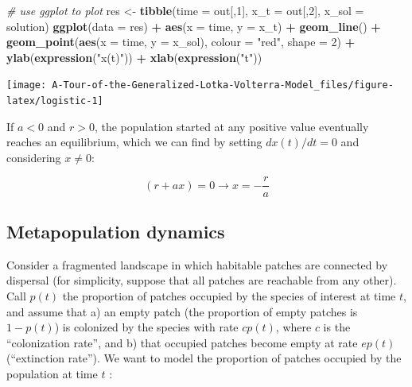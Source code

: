 \documentclass[
]{book}
\newenvironment{Shaded}{\begin{snugshade}}{\end{snugshade}}
\newcommand{\CommentTok}[1]{\textcolor[rgb]{0.56,0.35,0.01}{\textit{#1}}}
\newcommand{\DataTypeTok}[1]{\textcolor[rgb]{0.13,0.29,0.53}{#1}}
\newcommand{\DecValTok}[1]{\textcolor[rgb]{0.00,0.00,0.81}{#1}}
\newcommand{\KeywordTok}[1]{\textcolor[rgb]{0.13,0.29,0.53}{\textbf{#1}}}
\newcommand{\NormalTok}[1]{#1}
\newcommand{\OperatorTok}[1]{\textcolor[rgb]{0.81,0.36,0.00}{\textbf{#1}}}
\newcommand{\StringTok}[1]{\textcolor[rgb]{0.31,0.60,0.02}{#1}}
\begin{document}
\begin{Shaded}
\begin{Highlighting}[]
\CommentTok{# use ggplot to plot}
\NormalTok{res <-}\StringTok{ }\KeywordTok{tibble}\NormalTok{(}\DataTypeTok{time =}\NormalTok{ out[,}\DecValTok{1}\NormalTok{], }\DataTypeTok{x_t =}\NormalTok{ out[,}\DecValTok{2}\NormalTok{], }\DataTypeTok{x_sol =}\NormalTok{ solution)}
\KeywordTok{ggplot}\NormalTok{(}\DataTypeTok{data =}\NormalTok{ res) }\OperatorTok{+}\StringTok{ }\KeywordTok{aes}\NormalTok{(}\DataTypeTok{x =}\NormalTok{ time, }\DataTypeTok{y =}\NormalTok{ x_t) }\OperatorTok{+}\StringTok{ }
\StringTok{  }\KeywordTok{geom_line}\NormalTok{() }\OperatorTok{+}\StringTok{ }
\StringTok{  }\KeywordTok{geom_point}\NormalTok{(}\KeywordTok{aes}\NormalTok{(}\DataTypeTok{x =}\NormalTok{ time, }\DataTypeTok{y =}\NormalTok{ x_sol), }\DataTypeTok{colour =} \StringTok{"red"}\NormalTok{, }\DataTypeTok{shape =} \DecValTok{2}\NormalTok{) }\OperatorTok{+}\StringTok{ }
\StringTok{  }\KeywordTok{ylab}\NormalTok{(}\KeywordTok{expression}\NormalTok{(}\StringTok{"x(t)"}\NormalTok{)) }\OperatorTok{+}\StringTok{ }\KeywordTok{xlab}\NormalTok{(}\KeywordTok{expression}\NormalTok{(}\StringTok{"t"}\NormalTok{))}
\end{Highlighting}
\end{Shaded}

\begin{center}\texttt{[image: A-Tour-of-the-Generalized-Lotka-Volterra-Model\_files/figure-latex/logistic-1]} \end{center}

If \(a < 0\) and \(r > 0\), the population started at any positive value eventually reaches an equilibrium, which we can find by setting \(dx(t)/dt = 0\) and considering \(x \neq 0\):

\[
(r + a x) = 0 \to x = -\frac{r}{a}
\]

\hypertarget{metapopulation-dynamics}{%
\subsection{Metapopulation dynamics}\label{metapopulation-dynamics}}

Consider a fragmented landscape in which habitable patches are connected by dispersal (for simplicity, suppose that all patches are reachable from any other). Call \(p(t)\) the proportion of patches occupied by the species of interest at time \(t\), and assume that a) an empty patch (the proportion of empty patches is \(1 - p(t)\)) is colonized by the species with rate \(c p(t)\), where \(c\) is the ``colonization rate'', and b) that occupied patches become empty at rate \(e p(t)\) (``extinction rate''). We want to model the proportion of patches occupied by the population at time \(t\) \citep{levins1969some}:
\end{document}
